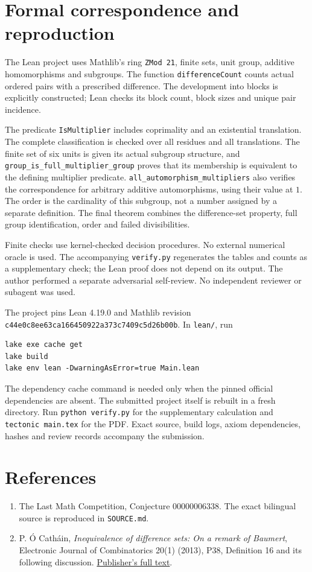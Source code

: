 \documentclass[11pt]{article}
\begin{document}
\section*{Formal correspondence and reproduction}
The Lean project uses Mathlib's ring \texttt{ZMod 21}, finite sets,
unit group, additive homomorphisms and subgroups. The function
\texttt{differenceCount} counts actual ordered pairs with a prescribed
difference. The development into blocks is explicitly constructed;
Lean checks its block count, block sizes and unique pair incidence.

The predicate \texttt{IsMultiplier} includes coprimality and an
existential translation. The complete classification is checked over
all residues and all translations. The finite set of six units is
given its actual subgroup structure, and
\texttt{group\_is\_full\_multiplier\_group} proves that its membership
is equivalent to the defining multiplier predicate.
\texttt{all\_automorphism\_multipliers} also verifies the correspondence
for arbitrary additive automorphisms, using their value at $1$.
The order is the cardinality of this subgroup, not a number assigned
by a separate definition. The final theorem combines the difference-set
property, full group identification, order and failed divisibilities.

Finite checks use kernel-checked decision procedures. No external
numerical oracle is used. The accompanying \texttt{verify.py} regenerates
the tables and counts as a supplementary check; the Lean proof does
not depend on its output. The author performed a separate adversarial
self-review. No independent reviewer or subagent was used.

The project pins Lean 4.19.0 and Mathlib revision\\
\texttt{c44e0c8ee63ca166450922a373c7409c5d26b00b}.
In \texttt{lean/}, run
\begin{verbatim}
lake exe cache get
lake build
lake env lean -DwarningAsError=true Main.lean
\end{verbatim}
The dependency cache command is needed only when the pinned official
dependencies are absent. The submitted project itself is rebuilt in
a fresh directory. Run \texttt{python verify.py} for the supplementary
calculation and \texttt{tectonic main.tex} for the PDF. Exact source,
build logs, axiom dependencies, hashes and review records accompany
the submission.

\section*{References}
\begin{enumerate}
\item The Last Math Competition, Conjecture 00000006338.
The exact bilingual source is reproduced in \texttt{SOURCE.md}.
\item P. \'{O} Cath\'{a}in, \emph{Inequivalence of difference sets:
On a remark of Baumert}, Electronic Journal of Combinatorics 20(1)
(2013), P38, Definition 16 and its following discussion.
\href{https://www.combinatorics.org/ojs/index.php/eljc/article/download/v20i1p38/pdf/}{Publisher's full text}.
\end{enumerate}
\end{document}
